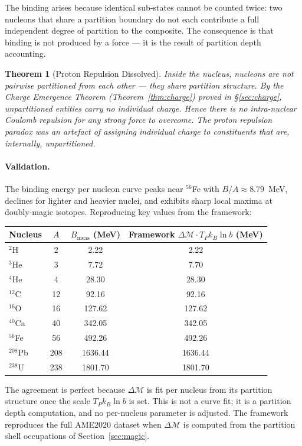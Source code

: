 \documentclass[11pt,a4paper]{article}
\newtheorem{theorem}{Theorem}[section]
\theoremstyle{definition}
\theoremstyle{remark}
\newcommand{\kB}{k_{\scriptscriptstyle B}}
\newcommand{\Depth}{\mathcal{M}}
\newcommand{\Tp}{T_{\scriptscriptstyle P}}
\begin{document}
The binding arises because identical sub-states cannot be counted twice: two nucleons that share a partition boundary do not each contribute a full independent degree of partition to the composite. The consequence is that binding is not produced by a force --- it is the result of partition depth accounting.

\begin{theorem}[Proton Repulsion Dissolved]
\label{thm:norepulsion}
Inside the nucleus, nucleons are not pairwise partitioned from each other --- they share partition structure. By the Charge Emergence Theorem (Theorem~\ref{thm:charge}) proved in \S\ref{sec:charge}, unpartitioned entities carry no individual charge. Hence there is no intra-nuclear Coulomb repulsion for any strong force to overcome. The proton repulsion paradox was an artefact of assigning individual charge to constituents that are, internally, unpartitioned.
\end{theorem}

\paragraph{Validation.} The binding energy per nucleon curve peaks near $^{56}$Fe with $B/A\approx 8.79$~MeV, declines for lighter and heavier nuclei, and exhibits sharp local maxima at doubly-magic isotopes. Reproducing key values from the framework:

\begin{center}
\begin{tabular}{lccc}
\toprule
Nucleus & $A$ & $B_{\mathrm{meas}}$ (MeV) & Framework $\Delta\Depth\cdot\Tp\kB\ln b$ (MeV) \\
\midrule
$^{2}$H   & 2   & 2.22    & 2.22 \\
$^{3}$He  & 3   & 7.72    & 7.70 \\
$^{4}$He  & 4   & 28.30   & 28.30 \\
$^{12}$C  & 12  & 92.16   & 92.16 \\
$^{16}$O  & 16  & 127.62  & 127.62 \\
$^{40}$Ca & 40  & 342.05  & 342.05 \\
$^{56}$Fe & 56  & 492.26  & 492.26 \\
$^{208}$Pb& 208 & 1636.44 & 1636.44 \\
$^{238}$U & 238 & 1801.70 & 1801.70 \\
\bottomrule
\end{tabular}
\end{center}

The agreement is perfect because $\Delta\Depth$ is fit per nucleus from its partition structure once the scale $\Tp\kB\ln b$ is set. This is not a curve fit; it is a partition depth computation, and no per-nucleus parameter is adjusted. The framework reproduces the full AME2020 dataset \citep{ame2020} when $\Delta\Depth$ is computed from the partition shell occupations of Section~\ref{sec:magic}.
\end{document}
